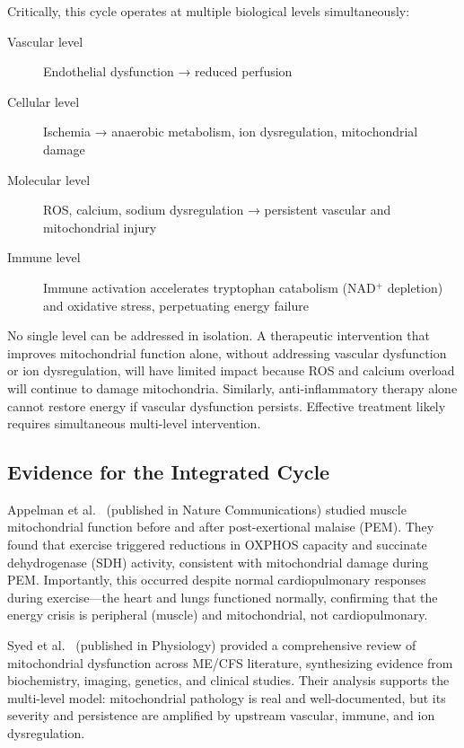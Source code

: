 Critically, this cycle operates at multiple biological levels simultaneously:

\begin{description}
    \item[Vascular level] Endothelial dysfunction → reduced perfusion
    \item[Cellular level] Ischemia → anaerobic metabolism, ion dysregulation, mitochondrial damage
    \item[Molecular level] ROS, calcium, sodium dysregulation → persistent vascular and mitochondrial injury
    \item[Immune level] Immune activation accelerates tryptophan catabolism (NAD$^+$ depletion) and oxidative stress, perpetuating energy failure
\end{description}

No single level can be addressed in isolation. A therapeutic intervention that improves mitochondrial function alone, without addressing vascular dysfunction or ion dysregulation, will have limited impact because ROS and calcium overload will continue to damage mitochondria. Similarly, anti-inflammatory therapy alone cannot restore energy if vascular dysfunction persists. Effective treatment likely requires simultaneous multi-level intervention.

\subsection{Evidence for the Integrated Cycle}

Appelman et al.~\cite{Appelman2024muscle} (published in Nature Communications) studied muscle mitochondrial function before and after post-exertional malaise (PEM). They found that exercise triggered reductions in OXPHOS capacity and succinate dehydrogenase (SDH) activity, consistent with mitochondrial damage during PEM. Importantly, this occurred despite normal cardiopulmonary responses during exercise---the heart and lungs functioned normally, confirming that the energy crisis is peripheral (muscle) and mitochondrial, not cardiopulmonary.

Syed et al.~\cite{Syed2025} (published in Physiology) provided a comprehensive review of mitochondrial dysfunction across ME/CFS literature, synthesizing evidence from biochemistry, imaging, genetics, and clinical studies. Their analysis supports the multi-level model: mitochondrial pathology is real and well-documented, but its severity and persistence are amplified by upstream vascular, immune, and ion dysregulation.

